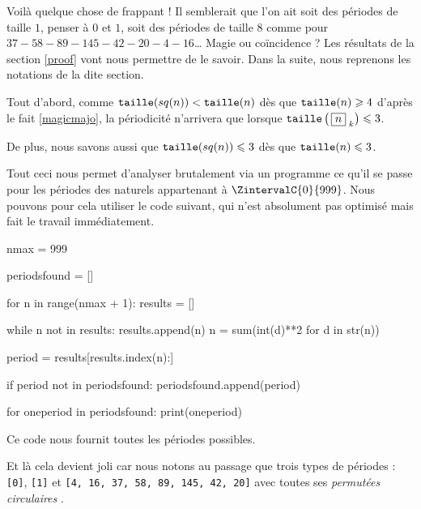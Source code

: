 \medskip

Voilà quelque chose de frappant ! Il semblerait que l'on ait soit des périodes de taille $1$, penser à $0$ et $1$, soit des périodes de taille $8$ comme pour $37 - 58 - 89 - 145 - 42 - 20 - 4 - 16$\dots{}
Magie ou coïncidence ? Les résultats de la section \ref{proof} vont nous permettre de le savoir. Dans la suite, nous reprenons les notations de la dite section.


\medskip

Tout d'abord, comme $\operatorname{\text{\normalfont\texttt{taille}}}(sq(n)) < \operatorname{\text{\normalfont\texttt{taille}}}(n)$ dès que $\operatorname{\text{\normalfont\texttt{taille}}}(n) \geqslant 4$ d'après le fait \ref{magicmajo}, la périodicité n'arrivera que lorsque $\operatorname{\text{\normalfont\texttt{taille}}}\left( \, \fbox{$n$}_{\,\,k} \right) \leqslant 3$.


\medskip

De plus, nous savons aussi que $\operatorname{\text{\normalfont\texttt{taille}}}(sq(n)) \leqslant 3$ dès que $\operatorname{\text{\normalfont\texttt{taille}}}(n) \leqslant 3$.


\medskip

Tout ceci nous permet d'analyser brutalement via un programme ce qu'il se passe pour les périodes des naturels appartenant à $\ZintervalC{0}{999}$. Nous pouvons pour cela utiliser le code suivant, qui n'est absolument pas optimisé mais fait le travail immédiatement.

\begin{rawcode}
nmax = 999

periodsfound = []

for n in range(nmax + 1):
    results = []

    while n not in results:
        results.append(n)
        n = sum(int(d)**2 for d in str(n))

    period = results[results.index(n):]

    if period not in periodsfound:
        periodsfound.append(period)

for oneperiod in periodsfound:
    print(oneperiod)
\end{rawcode}


\medskip

Ce code nous fournit toutes les périodes possibles.

\begin{rawcode}
[0]
[1]
[4, 16, 37, 58, 89, 145, 42, 20]
[37, 58, 89, 145, 42, 20, 4, 16]
[89, 145, 42, 20, 4, 16, 37, 58]
[16, 37, 58, 89, 145, 42, 20, 4]
[20, 4, 16, 37, 58, 89, 145, 42]
[58, 89, 145, 42, 20, 4, 16, 37]
[42, 20, 4, 16, 37, 58, 89, 145]
[145, 42, 20, 4, 16, 37, 58, 89]
\end{rawcode}


\medskip

Et là cela devient joli car nous notons au passage que trois types de périodes : 
\verb+[0]+, \verb+[1]+ et
\verb+[4, 16, 37, 58, 89, 145, 42, 20]+ avec toutes ses \emph{\og permutées circulaires \fg}.